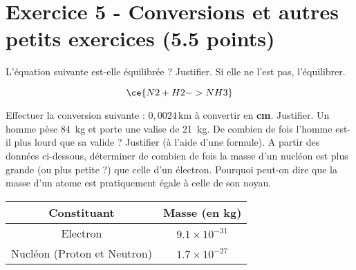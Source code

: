 \documentclass[answers]{exam}
\begin{document}
\section*{Exercice 5 - Conversions et autres petits exercices (5.5 points)}

\begin{questions}
  \question[2] L'équation suivante est-elle équilibrée ? Justifier. Si elle ne l'est pas, l'équilibrer.
  
  \[
  \ce{N2 + H2 -> NH3}
  \]
  
  \question[1] Effectuer la conversion suivante : \( 0,0024 \, \mathrm{km} \) à convertir en \textbf{cm}. Justifier.
  \question[2.5] Un homme pèse \SI{84}{kg} et porte une valise de \SI{21}{kg}. De combien de fois l'homme est-il plus lourd que sa valide ? Justifier (à l'aide d'une formule). A partir des données ci-dessous, déterminer de combien de fois la masse d'un nucléon est plus grande (ou plus petite ?) que celle d'un électron. Pourquoi peut-on dire que la masse d'un atome est pratiquement égale à celle de son noyau.

  \begin{center}
    \begin{tabular}{SS}
      \toprule
      {Constituant} & {Masse (en \si{kg})} \\
      \midrule
      {Electron} & {\(9.1 \times 10^{-31}\)} \\
      {Nucléon (Proton et Neutron)} & {\(1.7 \times 10^{-27}\)} \\
      \bottomrule
    \end{tabular}
  \end{center}
\end{questions}
\end{document}
